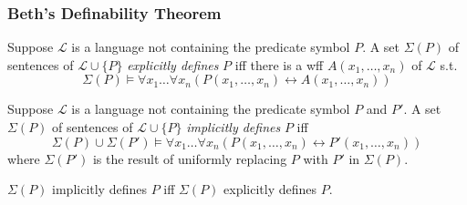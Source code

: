 \documentclass[UTF8,11pt,colorlinks,compress,openany]{beamer}%
\begin{document}
\begin{frame}\frametitle{Beth's Definability Theorem}
\setlength\abovedisplayskip{0pt}
\setlength\belowdisplayskip{0pt}
	\begin{definition}
		Suppose $\mathscr{L}$ is a language not containing the predicate symbol $P$. A set $\Sigma(P)$ of sentences of $\mathscr{L}\cup\{P\}$ \emph{explicitly defines} $P$ iff there is a wff $A(x_1,\dots,x_n)$ of $\mathscr{L}$ s.t.
		\[\Sigma(P)\vDash\forall x_1\dots\forall x_n(P(x_1,\dots,x_n)\leftrightarrow A(x_1,\dots,x_n))\]
	\end{definition}
	\begin{definition}
		Suppose $\mathscr{L}$ is a language not containing the predicate symbol $P$ and $P'$. A set $\Sigma(P)$ of sentences of $\mathscr{L}\cup\{P\}$ \emph{implicitly defines} $P$ iff
		\[\Sigma(P)\cup\Sigma(P')\vDash\forall x_1\dots\forall x_n(P(x_1,\dots,x_n)\leftrightarrow P'(x_1,\dots,x_n))\]
		where $\Sigma(P')$ is the result of uniformly replacing $P$ with $P'$ in $\Sigma(P)$.
	\end{definition}
	\begin{theorem}
		$\Sigma(P)$ implicitly defines $P$ iff $\Sigma(P)$ explicitly defines $P$.
	\end{theorem}
	\centerline{}
\end{frame}
\end{document}
